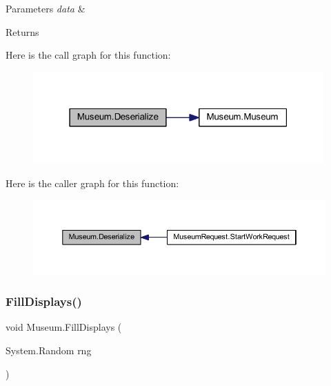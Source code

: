 \begin{DoxyParams}{Parameters}
{\em data} & \\
\hline
\end{DoxyParams}
\begin{DoxyReturn}{Returns}

\end{DoxyReturn}
Here is the call graph for this function\+:
\nopagebreak
\begin{figure}[H]
\begin{center}
\leavevmode
\includegraphics[width=316pt]{class_museum_a1b4fb627a19112e3ba3d25e8108de2c3_cgraph}
\end{center}
\end{figure}
Here is the caller graph for this function\+:
\nopagebreak
\begin{figure}[H]
\begin{center}
\leavevmode
\includegraphics[width=350pt]{class_museum_a1b4fb627a19112e3ba3d25e8108de2c3_icgraph}
\end{center}
\end{figure}
\mbox{\label{class_museum_ae07741bc8fd7f97c84fed0050e18c3c4}} 
\subsubsection{\texorpdfstring{Fill\+Displays()}{FillDisplays()}}
{\footnotesize\ttfamily void Museum.\+Fill\+Displays (\begin{DoxyParamCaption}\item[{System.\+Random}]{rng }\end{DoxyParamCaption})\hspace{0.3cm}{\ttfamily [private]}}



